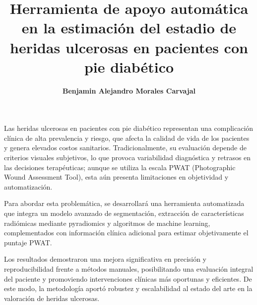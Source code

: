 \documentclass[12pt,letterpaper]{report}
\begin{document}
\title{\textbf{Herramienta de apoyo automática en la estimación del estadio de heridas ulcerosas en pacientes con pie diabético}}
\author{\textbf{Benjamin Alejandro Morales Carvajal}}


\beforepreface
{}

Las heridas ulcerosas en pacientes con pie diabético representan una complicación clínica de alta prevalencia y riesgo, que afecta la calidad de vida de los pacientes y genera elevados costos sanitarios. Tradicionalmente, su evaluación depende de criterios visuales subjetivos, lo que provoca variabilidad diagnóstica y retrasos en las decisiones terapéuticas; aunque se utiliza la escala PWAT (Photographic Wound Assessment Tool), esta aún presenta limitaciones en objetividad y automatización.

Para abordar esta problemática, se desarrollará una herramienta automatizada que integra un modelo avanzado de segmentación, extracción de características radiómicas mediante pyradiomics y algoritmos de machine learning, complementados con información clínica adicional para estimar objetivamente el puntaje PWAT.

Los resultados demostraron una mejora significativa en precisión y reproducibilidad frente a métodos manuales, posibilitando una evaluación integral del paciente y promoviendo intervenciones clínicas más oportunas y eficientes. De este modo, la metodología aportó robustez y escalabilidad al estado del arte en la valoración de heridas ulcerosas.
\end{document}
